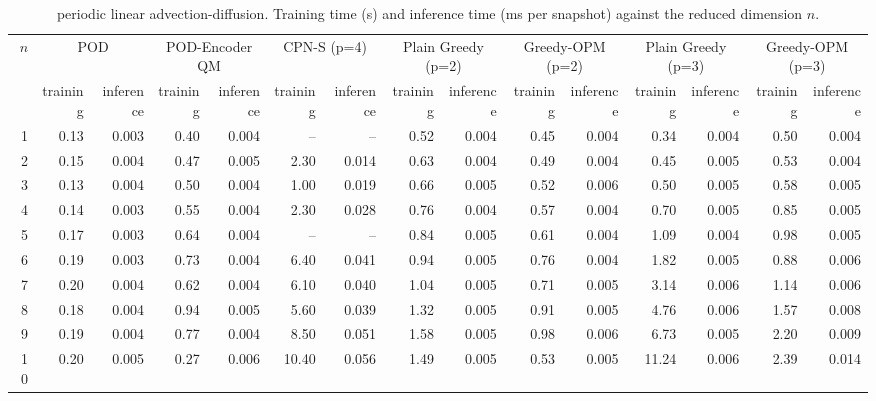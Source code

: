 \begin{table}[tb]
  \centering
  \caption{periodic linear advection-diffusion. Training time (s) and inference time (ms per snapshot) against the reduced dimension \( n \).}
  \label{tab:lin_adv_diff_timings}
  \small
  \setlength{\tabcolsep}{4pt}
  \begin{tabular}{rrrrrrrrrrrrrrr}
    \toprule
    \multirow{2}{*}{\( n \)} & \multicolumn{2}{c}{POD} & \multicolumn{2}{c}{POD-Encoder QM} & \multicolumn{2}{c}{CPN-S (p=4)} & \multicolumn{2}{c}{Plain Greedy (p=2)} & \multicolumn{2}{c}{Greedy-OPM (p=2)} & \multicolumn{2}{c}{Plain Greedy (p=3)} & \multicolumn{2}{c}{Greedy-OPM (p=3)} \\
    \cmidrule(lr){2-3} \cmidrule(lr){4-5} \cmidrule(lr){6-7} \cmidrule(lr){8-9} \cmidrule(lr){10-11} \cmidrule(lr){12-13} \cmidrule(lr){14-15}
     & training & inference & training & inference & training & inference & training & inference & training & inference & training & inference & training & inference \\
    \midrule
    1 & 0.13 & 0.003 & 0.40 & 0.004 & -- & -- & 0.52 & 0.004 & 0.45 & 0.004 & 0.34 & 0.004 & 0.50 & 0.004 \\
    2 & 0.15 & 0.004 & 0.47 & 0.005 & 2.30 & 0.014 & 0.63 & 0.004 & 0.49 & 0.004 & 0.45 & 0.005 & 0.53 & 0.004 \\
    3 & 0.13 & 0.004 & 0.50 & 0.004 & 1.00 & 0.019 & 0.66 & 0.005 & 0.52 & 0.006 & 0.50 & 0.005 & 0.58 & 0.005 \\
    4 & 0.14 & 0.003 & 0.55 & 0.004 & 2.30 & 0.028 & 0.76 & 0.004 & 0.57 & 0.004 & 0.70 & 0.005 & 0.85 & 0.005 \\
    5 & 0.17 & 0.003 & 0.64 & 0.004 & -- & -- & 0.84 & 0.005 & 0.61 & 0.004 & 1.09 & 0.004 & 0.98 & 0.005 \\
    6 & 0.19 & 0.003 & 0.73 & 0.004 & 6.40 & 0.041 & 0.94 & 0.005 & 0.76 & 0.004 & 1.82 & 0.005 & 0.88 & 0.006 \\
    7 & 0.20 & 0.004 & 0.62 & 0.004 & 6.10 & 0.040 & 1.04 & 0.005 & 0.71 & 0.005 & 3.14 & 0.006 & 1.14 & 0.006 \\
    8 & 0.18 & 0.004 & 0.94 & 0.005 & 5.60 & 0.039 & 1.32 & 0.005 & 0.91 & 0.005 & 4.76 & 0.006 & 1.57 & 0.008 \\
    9 & 0.19 & 0.004 & 0.77 & 0.004 & 8.50 & 0.051 & 1.58 & 0.005 & 0.98 & 0.006 & 6.73 & 0.005 & 2.20 & 0.009 \\
    10 & 0.20 & 0.005 & 0.27 & 0.006 & 10.40 & 0.056 & 1.49 & 0.005 & 0.53 & 0.005 & 11.24 & 0.006 & 2.39 & 0.014 \\
    \bottomrule
  \end{tabular}
\end{table}
